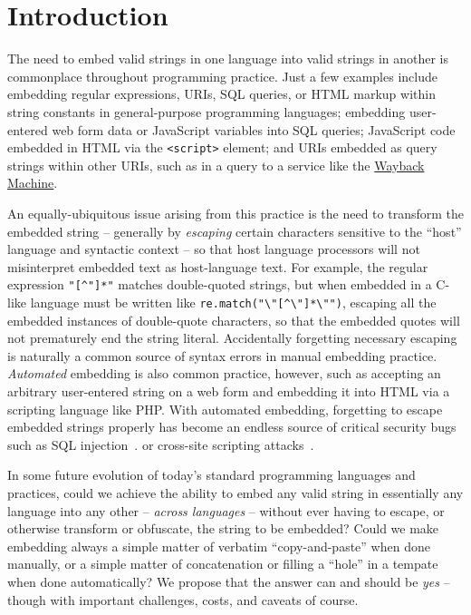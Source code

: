 \section{Introduction}
\label{sec:intro}

The need to embed valid strings in one language into valid strings in another
is commonplace throughout programming practice.
Just a few examples include embedding
regular expressions, URIs, SQL queries, or HTML markup
within string constants in general-purpose programming languages;
embedding user-entered web form data or JavaScript variables into SQL queries;
JavaScript code embedded in HTML via the \verb|<script>| element;
and URIs embedded as query strings within other URIs,
such as in a query to a service like the
\href{https://archive.org/web/}{Wayback Machine}.

An equally-ubiquitous issue arising from this practice
is the need to transform the embedded string --
generally by \emph{escaping} certain characters sensitive
to the ``host'' language and syntactic context --
so that host language processors will not misinterpret embedded text
as host-language text.
For example,
the regular expression \verb|"[^"]*"| matches double-quoted strings,
but when embedded in a C-like language must be written
like \verb|re.match("\"[^\"]*\"")|,
escaping all the embedded instances of double-quote characters,
so that the embedded quotes will not prematurely end the string literal.
Accidentally forgetting necessary escaping
is naturally a common source of syntax errors in manual embedding practice.
\emph{Automated} embedding is also common practice, however,
such as accepting an arbitrary user-entered string on a web form
and embedding it into HTML via a scripting language like PHP.
With automated embedding,
forgetting to escape embedded strings properly
has become an endless source of critical security bugs
such as SQL injection~\cite{clarke12sql}.
or cross-site scripting attacks~\cite{fogie07xss}.

In some future evolution
of today's standard programming languages and practices,
could we achieve the ability to embed any valid string
in essentially any language into any other --
\emph{across languages} --
without ever having to escape, or otherwise transform or obfuscate,
the string to be embedded?
Could we make embedding always a simple matter of verbatim ``copy-and-paste''
when done manually,
or a simple matter of concatenation
or filling a ``hole'' in a tempate
when done automatically?
We propose that the answer can and should be \emph{yes} --
though with important challenges, costs, and caveats of course.


